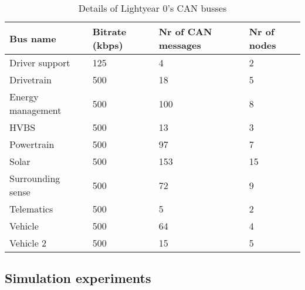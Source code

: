 \begin{table}[]
    \centering
    \begin{tabular}{@{}llll@{}}
    \toprule
    Bus name          & Bitrate (kbps) & Nr of CAN messages & Nr of nodes \\ \midrule
    Driver support    & 125            & 4                  & 2           \\
    Drivetrain        & 500            & 18                 & 5           \\
    Energy management & 500            & 100                & 8           \\
    HVBS              & 500            & 13                 & 3           \\
    Powertrain        & 500            & 97                 & 7           \\
    Solar             & 500            & 153                & 15          \\
    Surrounding sense & 500            & 72                 & 9           \\
    Telematics        & 500            & 5                  & 2           \\
    Vehicle           & 500            & 64                 & 4           \\
    Vehicle 2         & 500            & 15                 & 5           \\ \bottomrule
    \end{tabular}
    \caption{Details of Lightyear 0's CAN busses}
    \label{tab:can_busses}
\end{table}

\subsection{Simulation experiments}